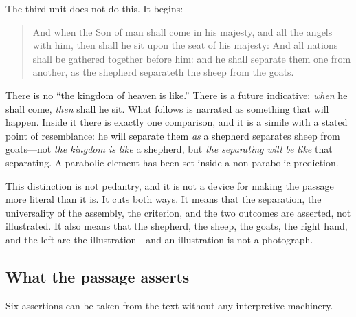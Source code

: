 The third unit does not do this. It begins:

\begin{quote}
And when the Son of man shall come in his majesty, and all the angels with him, then shall he sit upon the seat of his majesty: And all nations shall be gathered together before him: and he shall separate them one from another, as the shepherd separateth the sheep from the goats.
\end{quote}

There is no ``the kingdom of heaven is like.'' There is a future indicative: \emph{when} he shall come, \emph{then} shall he sit. What follows is narrated as something that will happen. Inside it there is exactly one comparison, and it is a simile with a stated point of resemblance: he will separate them \emph{as} a shepherd separates sheep from goats---not \emph{the kingdom is like} a shepherd, but \emph{the separating will be like} that separating. A parabolic element has been set inside a non-parabolic prediction.

This distinction is not pedantry, and it is not a device for making the passage more literal than it is. It cuts both ways. It means that the separation, the universality of the assembly, the criterion, and the two outcomes are asserted, not illustrated. It also means that the shepherd, the sheep, the goats, the right hand, and the left are the illustration---and an illustration is not a photograph.

\subsection{What the passage asserts}

Six assertions can be taken from the text without any interpretive machinery.

